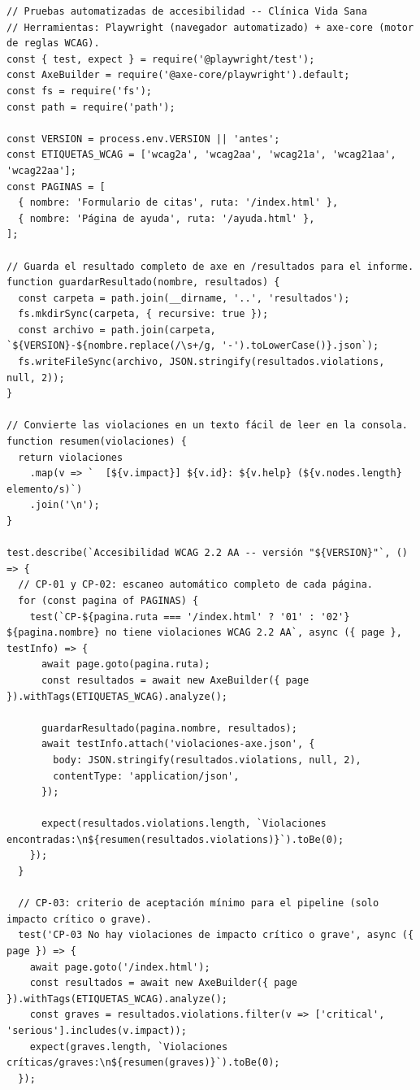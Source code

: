 \documentclass[10pt,letterpaper,onecolumn]{IEEEtran}
\begin{document}
\begin{lstlisting}
// Pruebas automatizadas de accesibilidad -- Clínica Vida Sana
// Herramientas: Playwright (navegador automatizado) + axe-core (motor de reglas WCAG).
const { test, expect } = require('@playwright/test');
const AxeBuilder = require('@axe-core/playwright').default;
const fs = require('fs');
const path = require('path');

const VERSION = process.env.VERSION || 'antes';
const ETIQUETAS_WCAG = ['wcag2a', 'wcag2aa', 'wcag21a', 'wcag21aa', 'wcag22aa'];
const PAGINAS = [
  { nombre: 'Formulario de citas', ruta: '/index.html' },
  { nombre: 'Página de ayuda', ruta: '/ayuda.html' },
];

// Guarda el resultado completo de axe en /resultados para el informe.
function guardarResultado(nombre, resultados) {
  const carpeta = path.join(__dirname, '..', 'resultados');
  fs.mkdirSync(carpeta, { recursive: true });
  const archivo = path.join(carpeta, `${VERSION}-${nombre.replace(/\s+/g, '-').toLowerCase()}.json`);
  fs.writeFileSync(archivo, JSON.stringify(resultados.violations, null, 2));
}

// Convierte las violaciones en un texto fácil de leer en la consola.
function resumen(violaciones) {
  return violaciones
    .map(v => `  [${v.impact}] ${v.id}: ${v.help} (${v.nodes.length} elemento/s)`)
    .join('\n');
}

test.describe(`Accesibilidad WCAG 2.2 AA -- versión "${VERSION}"`, () => {
  // CP-01 y CP-02: escaneo automático completo de cada página.
  for (const pagina of PAGINAS) {
    test(`CP-${pagina.ruta === '/index.html' ? '01' : '02'} ${pagina.nombre} no tiene violaciones WCAG 2.2 AA`, async ({ page }, testInfo) => {
      await page.goto(pagina.ruta);
      const resultados = await new AxeBuilder({ page }).withTags(ETIQUETAS_WCAG).analyze();

      guardarResultado(pagina.nombre, resultados);
      await testInfo.attach('violaciones-axe.json', {
        body: JSON.stringify(resultados.violations, null, 2),
        contentType: 'application/json',
      });

      expect(resultados.violations.length, `Violaciones encontradas:\n${resumen(resultados.violations)}`).toBe(0);
    });
  }

  // CP-03: criterio de aceptación mínimo para el pipeline (solo impacto crítico o grave).
  test('CP-03 No hay violaciones de impacto crítico o grave', async ({ page }) => {
    await page.goto('/index.html');
    const resultados = await new AxeBuilder({ page }).withTags(ETIQUETAS_WCAG).analyze();
    const graves = resultados.violations.filter(v => ['critical', 'serious'].includes(v.impact));
    expect(graves.length, `Violaciones críticas/graves:\n${resumen(graves)}`).toBe(0);
  });


\end{lstlisting}
\end{document}
